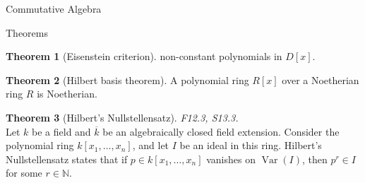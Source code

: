 \documentclass{article}
\theoremstyle{definition}
\newtheorem{theorem}{Theorem}
\numberwithin{theorem}{subsection} %
\theoremstyle{remark}
\theoremstyle{definition}
\newcommand{\Var}{\operatorname{Var}}
\newcommand{\N}{\mathbb N}
\begin{document}
\begin{section}{Commutative Algebra}
\begin{subsection}{Theorems}
\begin{theorem}[Eisenstein criterion]
      non-constant polynomials in $D[x]$.
    \end{theorem}
    \begin{theorem}[Hilbert basis theorem]
      A polynomial ring $R[x]$ over a Noetherian ring $R$ is Noetherian.
    \end{theorem}
    \begin{theorem}[Hilbert's Nullstellensatz]
      \textit{F12.3, S13.3.} \\
      Let $k$ be a field and $\overline k$ be an algebraically closed field
      extension. Consider the polynomial ring $k[x_1, \hdots, x_n]$, and let
      $I$ be an ideal in this ring.
      Hilbert's Nullstellensatz states that if $p \in k[x_1, \hdots, x_n]$
      vanishes on $\Var(I)$, then $p^r \in I$ for some $r \in \N$.
    \end{theorem}
  \end{subsection}
\end{section}
\pagebreak
\end{document}
